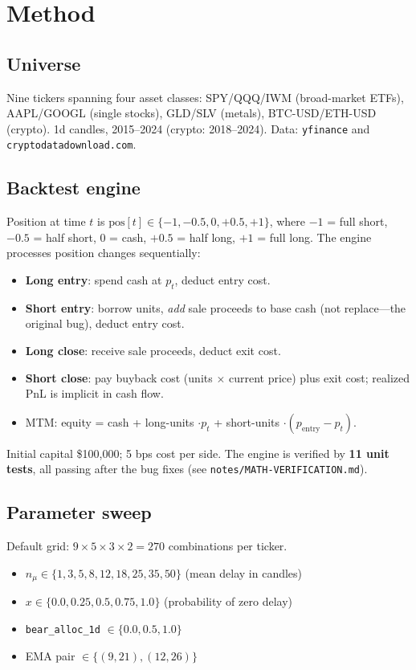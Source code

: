\documentclass[11pt,a4paper]{article}
\begin{document}
\section{Method}

\subsection{Universe}

Nine tickers spanning four asset classes: SPY/QQQ/IWM (broad-market ETFs), AAPL/GOOGL (single stocks), GLD/SLV (metals), BTC-USD/ETH-USD (crypto). 1d candles, 2015--2024 (crypto: 2018--2024). Data: \texttt{yfinance} and \texttt{cryptodatadownload.com}.

\subsection{Backtest engine}

Position at time $t$ is $\text{pos}[t] \in \{-1, -0.5, 0, +0.5, +1\}$, where $-1$ = full short, $-0.5$ = half short, $0$ = cash, $+0.5$ = half long, $+1$ = full long. The engine processes position changes sequentially:
\begin{itemize}
\item \textbf{Long entry}: spend cash at $p_t$, deduct entry cost.
\item \textbf{Short entry}: borrow units, \emph{add} sale proceeds to base cash (not replace---the original bug), deduct entry cost.
\item \textbf{Long close}: receive sale proceeds, deduct exit cost.
\item \textbf{Short close}: pay buyback cost (units $\times$ current price) plus exit cost; realized PnL is implicit in cash flow.
\item MTM: equity = cash + long-units $\cdot p_t$ + short-units $\cdot (p_{\text{entry}} - p_t)$.
\end{itemize}

Initial capital \$100{,}000; 5 bps cost per side. The engine is verified by \textbf{11 unit tests}, all passing after the bug fixes (see \texttt{notes/MATH-VERIFICATION.md}).

\subsection{Parameter sweep}

Default grid: $9 \times 5 \times 3 \times 2 = 270$ combinations per ticker.
\begin{itemize}
\item $n_\mu \in \{1, 3, 5, 8, 12, 18, 25, 35, 50\}$ (mean delay in candles)
\item $x \in \{0.0, 0.25, 0.5, 0.75, 1.0\}$ (probability of zero delay)
\item \texttt{bear\_alloc\_1d} $\in \{0.0, 0.5, 1.0\}$
\item EMA pair $\in \{(9, 21), (12, 26)\}$
\end{itemize}
\end{document}
